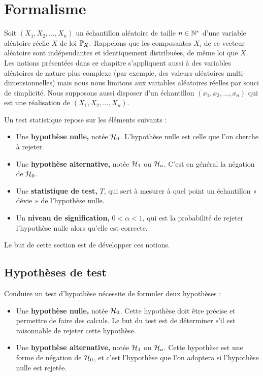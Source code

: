 \section{Formalisme}
\label{sec:formalisme_test}
Soit $(X_1, X_2, \dots, X_n)$ un échantillon aléatoire de taille $n \in \mathbb{N}^*$
d'une variable aléatoire réelle $X$ de loi $\mathbb{P}_X.$ Rappelons que les
composantes $X_i$ de ce vecteur aléatoire sont indépendantes et identiquement
distribuées, de même loi que $X$. Les notions présentées dans ce chapitre
s'appliquent aussi à des variables aléatoires de nature plus complexe (par
exemple, des valeurs aléatoires multi-dimensionnelles) mais nous nous limitons
aux variables aléatoires réelles par souci de simplicité.
Nous supposons aussi disposer d'un échantillon $(x_1, x_2, \dots, x_n)$ qui est
une réalisation de $(X_1, X_2, \dots, X_n)$.

Un test statistique repose sur les éléments suivants :
\begin{itemize}
	\item Une \textbf{hypothèse nulle,} notée $\mathcal{H}_0$. L'hypothèse nulle est
	celle que l'on cherche à rejeter.
	\item Une \textbf{hypothèse alternative,} notée $\mathcal{H}_1$ ou $\mathcal{H}_a$. C'est en
	général la négation de $\mathcal{H}_0$.
	\item Une \textbf{statistique de test,} $T$, qui sert à mesurer à quel point un
	échantillon « dévie » de l'hypothèse nulle.
	\item Un \textbf{niveau de signification,} $0 < \alpha < 1$, qui est la
	probabilité de rejeter l'hypothèse nulle alors qu'elle est correcte. 
\end{itemize}

Le but de cette section est de développer ces notions.

\subsection{Hypothèses de test}
Conduire un test d'hypothèse nécessite de formuler deux hypothèses :
\begin{itemize}
	\item Une \textbf{hypothèse nulle,} notée $\mathcal{H}_0$. Cette hypothèse doit être
	précise et permettre de faire des calculs. Le but du test est de déterminer
	s'il est raisonnable de rejeter cette hypothèse.
	\item Une \textbf{hypothèse alternative,} notée $\mathcal{H}_1$ ou $\mathcal{H}_a$. Cette
	hypothèse est une forme de négation de $\mathcal{H}_0$, et c'est l'hypothèse que l'on
	adoptera si l'hypothèse nulle est rejetée.
\end{itemize}

